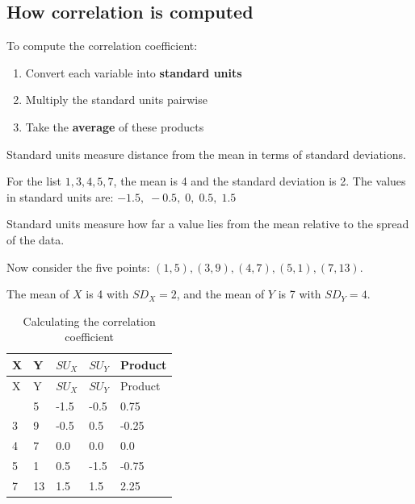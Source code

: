\documentclass[
  letterpaper,
  DIV=11,
  numbers=noendperiod]{scrreprt}
\providecommand{\tightlist}{%
  \setlength{\itemsep}{0pt}\setlength{\parskip}{0pt}}
\begin{document}
\subsection{How correlation is
computed}\label{how-correlation-is-computed}

To compute the correlation coefficient:

\begin{enumerate}
\def\labelenumi{\arabic{enumi}.}
\tightlist
\item
  Convert each variable into \textbf{standard units}
\item
  Multiply the standard units pairwise
\item
  Take the \textbf{average} of these products
\end{enumerate}

Standard units measure distance from the mean in terms of standard
deviations.

For the list \(1, 3, 4, 5, 7\), the mean is 4 and the standard deviation
is 2. The values in standard units are:
\(-1.5,\; -0.5,\; 0,\; 0.5,\; 1.5\)

\begin{tcolorbox}[enhanced jigsaw, coltitle=black, colbacktitle=quarto-callout-important-color!10!white, left=2mm, bottomrule=.15mm, bottomtitle=1mm, colback=white, titlerule=0mm, colframe=quarto-callout-important-color-frame, breakable, leftrule=.75mm, toptitle=1mm, opacitybacktitle=0.6, rightrule=.15mm, title=\textcolor{quarto-callout-important-color}{\faExclamation}\hspace{0.5em}{Standard units}, arc=.35mm, opacityback=0, toprule=.15mm]

Standard units measure how far a value lies from the mean relative to
the spread of the data.

\end{tcolorbox}

Now consider the five points: \((1,5), (3,9), (4,7), (5,1), (7,13)\).

The mean of \(X\) is 4 with \(SD_X = 2\), and the mean of \(Y\) is 7
with \(SD_Y = 4\).

\begin{longtable}[]{@{}lllll@{}}
\caption{Calculating the correlation
coefficient}\label{tbl-calculating-corr}\tabularnewline
\toprule\noalign{}
X & Y & \(SU_X\) & \(SU_Y\) & Product \\
\midrule\noalign{}
\endfirsthead
\toprule\noalign{}
X & Y & \(SU_X\) & \(SU_Y\) & Product \\
\midrule\noalign{}
\endhead
\bottomrule\noalign{}
\endlastfoot
1 & 5 & -1.5 & -0.5 & 0.75 \\
3 & 9 & -0.5 & 0.5 & -0.25 \\
4 & 7 & 0.0 & 0.0 & 0.0 \\
5 & 1 & 0.5 & -1.5 & -0.75 \\
7 & 13 & 1.5 & 1.5 & 2.25 \\
\end{longtable}
\end{document}

